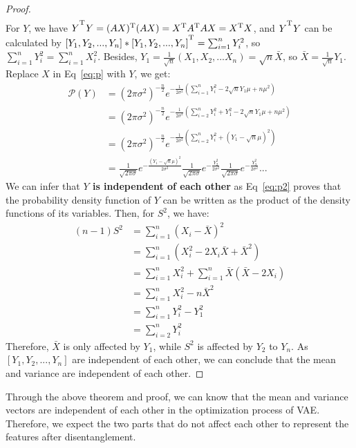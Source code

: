 \documentclass[letterpaper]{article} %
\begin{document}
\begin{proof}
\begin{equation}
\begin{array}{cl}
		\end{array} \label{eq:p}
	\end{equation}
	For $Y$, we have $Y^\textsuperscript{T}Y=(AX)\textsuperscript{T}(AX)=X\textsuperscript{T}A\textsuperscript{T}AX=X\textsuperscript{T}X$, and $Y^\textsuperscript{T}Y$ can be calculated by $[Y_1, Y_2, ..., Y_n]*[Y_1, Y_2, ..., Y_n]^\textsuperscript{T} = \sum_{i=1}^{n}Y_i^2$, so $\sum_{i=1}^{n}Y_i^2=\sum_{i=1}^{n}X_i^2$. Besides, $Y_1=\frac{1}{\sqrt{n}}(X_1, X_2,...X_n)=\sqrt{n}\bar{X}$, so $\bar{X}=\frac{1}{\sqrt{n}}Y_1$. Replace $X$ in Eq~\ref{eq:p} with $Y$, we get:
	\begin{equation}
		\begin{array}{cl}
			\mathcal{P}(Y)&=(2\pi\sigma^2)^{-\frac{n}{2}}e^{-\frac{1}{2\sigma^2}(\sum_{i=1}^{n}Y_i^2-2\sqrt{n}Y_1\mu+n\mu^2)}\\
			&=(2\pi\sigma^2)^{-\frac{n}{2}}e^{-\frac{1}{2\sigma^2}(\sum_{i=2}^{n}Y_i^2+Y_1^2-2\sqrt{n}Y_1\mu+n\mu^2)} \\
			&=(2\pi\sigma^2)^{-\frac{n}{2}}e^{-\frac{1}{2\sigma^2}(\sum_{i=2}^{n}Y_i^2+(Y_1-\sqrt{n}\mu)^2)} \\
			&=\frac{1}{\sqrt{2\pi \sigma}}e^{-\frac{(Y_1-\sqrt{n}\mu)^2}{2\sigma^2}} \frac{1}{\sqrt{2\pi \sigma}}e^{-\frac{Y_2^2}{2\sigma^2}} \frac{1}{\sqrt{2\pi \sigma}}e^{-\frac{Y_3^2}{2\sigma^2}}... 
		\end{array} \label{eq:p2}
	\end{equation}
	We can infer that \textbf{$Y$ is independent of each other} as Eq~\ref{eq:p2} proves that the probability density function of $Y$ can be written as the product of the density functions of its variables. Then, for $S^2$, we have:
	\begin{equation}
		\begin{array}{rl}
			(n-1)S^2&=\sum_{i=1}^{n}(X_i-\bar{X})^2 \\
			&=\sum_{i=1}^{n}(X_i^2-2X_i\bar{X}+\bar{X}^2) \\
			&=\sum_{i=1}^{n}X_i^2+\sum_{i=1}^{n}\bar{X}(\bar{X}-2X_i) \\
			&=\sum_{i=1}^{n}X_i^2-n\bar{X}^2 \\
			&=\sum_{i=1}^{n}Y_i^2-Y_1^2 \\
			&=\sum_{i=2}^{n}Y_i^2
		\end{array} \label{eq:p3}
	\end{equation}
	Therefore, $\bar{X}$ is only affected by $Y_1$, while $S^2$ is affected by $Y_2$ to $Y_n$. As $[Y_1, Y_2, ..., Y_n]$ are independent of each other, we can conclude that the mean and variance are independent of each other. 
\end{proof}
Through the above theorem and proof, we can know that the mean and variance vectors are independent of each other in the optimization process of VAE. Therefore, we expect the two parts that do not affect each other to represent the features after disentanglement.
\end{document}
